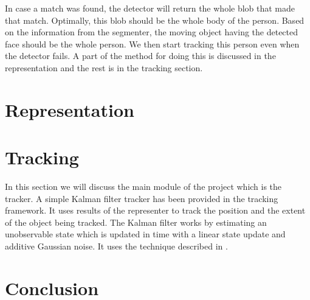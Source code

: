 \documentclass[12pt]{article}
\begin{document}
In case a match was found, the detector will return the whole blob that made that match. Optimally, this blob should be the whole body of the person. Based on the information from the segmenter, the moving object having the detected face should be the whole person. We then start tracking this person even when the detector fails. A part of the method for doing this is discussed in the representation and the rest is in the tracking section.

\section{Representation}

\section{Tracking}

In this section we will discuss the main module of the project which is the tracker. A simple Kalman filter tracker has been provided in the tracking framework. It uses results of the representer to track the position and the extent of the object being tracked. The Kalman filter works by estimating an unobservable state which is updated in time with a linear state update and additive Gaussian noise. It uses the technique described in \cite{Arulampalam01atutorial}.



\section{Conclusion}



\end{document}
